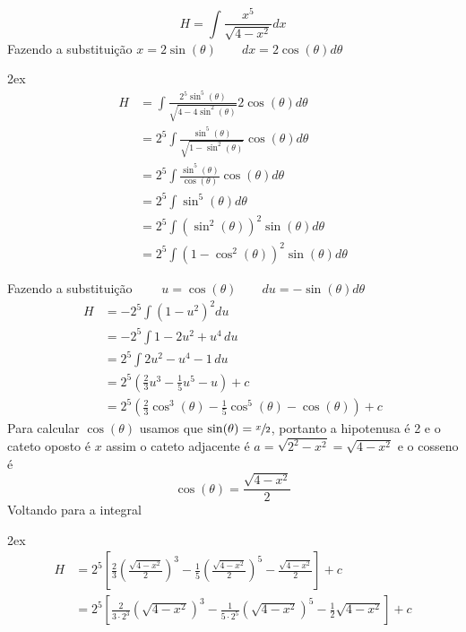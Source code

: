 \documentclass[a4paper,12pt,fleqn]{article}
\begin{document}
\begin{answer}
  \[
  H = \int \frac{x^5}{\sqrt{4-x^2}} dx
  \]
  Fazendo a substituição
  \(
  x = 2\sin(\theta)
  \qquad
  dx = 2\cos(\theta) d\theta
  \)
  \begin{spreadlines}{2ex}
    \begin{align*}
      H
      & = \int \frac{2^5 \sin^5(\theta)}{\sqrt{4-4\sin^2(\theta)}} 2\cos(\theta) d\theta \\
      & = 2^5 \int \frac{\sin^5(\theta)}{\sqrt{1-\sin^2(\theta)}} \cos(\theta) d\theta \\
      & = 2^5 \int \frac{\sin^5(\theta)}{\cos(\theta)} \cos(\theta) d\theta \\
      & = 2^5 \int \sin^5(\theta) d\theta \\
      & = 2^5 \int \left(\sin^2(\theta)\right)^2 \sin(\theta) d\theta \\
      & = 2^5 \int \left(1-\cos^2(\theta)\right)^2 \sin(\theta) d\theta
    \end{align*}
  \end{spreadlines}
  Fazendo a substituição
  \(
  \qquad
  u = \cos(\theta)
  \qquad
  du = -\sin(\theta)d\theta
  \)
  \begin{align*}
    H
    & = -2^5 \int \left(1-u^2\right)^2 du \\
    & = -2^5 \int 1-2u^2 + u^4\, du \\
    & = 2^5 \int 2u^2 - u^4 -1\, du \\
    & = 2^5 \left(\frac{2}{3}u^3 - \frac{1}{5}u^5 - u \right) + c \\
    & = 2^5 \left(\frac{2}{3}\cos^3(\theta)
    - \frac{1}{5}\cos^5(\theta)
    - \cos(\theta) \right) + c
  \end{align*}
  Para calcular \(\cos(\theta)\) usamos que \(\sin(\theta) = \sfrac{x}{2}\), portanto
  a hipotenusa é 2 e o cateto oposto é $x$ assim o cateto adjacente é
  \(
  a = \sqrt{2^2-x^2} = \sqrt{4-x^2}
  \)
  e o cosseno é
  \[
  \cos(\theta) = \frac{\sqrt{4-x^2}}{2}
  \]
  Voltando para a integral
  \begin{spreadlines}{2ex}
    \begin{align*}
      H
      & = 2^5\left[
      \frac{2}{3}\left(\frac{\sqrt{4-x^2}}{2}\right)^3
      - \frac{1}{5}\left(\frac{\sqrt{4-x^2}}{2}\right)^5
      - \frac{\sqrt{4-x^2}}{2}
      \right] + c \\
      & = 2^5\left[
      \frac{2}{3\cdot 2^3}\left(\sqrt{4-x^2}\right)^3
      - \frac{1}{5\cdot 2^5}\left(\sqrt{4-x^2}\right)^5
      - \frac{1}{2} \sqrt{4-x^2}
      \right] + c \\

\end{align*}
\end{spreadlines}
\end{answer}
\end{document}
